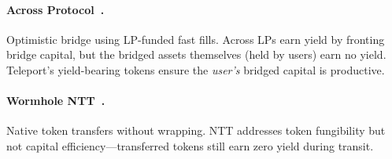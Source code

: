 \paragraph{Across Protocol~\cite{across2023}.} Optimistic bridge using LP-funded fast fills. Across LPs earn yield by fronting bridge capital, but the bridged assets themselves (held by users) earn no yield. Teleport's yield-bearing tokens ensure the \emph{user's} bridged capital is productive.

\paragraph{Wormhole NTT~\cite{wormhole}.} Native token transfers without wrapping. NTT addresses token fungibility but not capital efficiency---transferred tokens still earn zero yield during transit.

